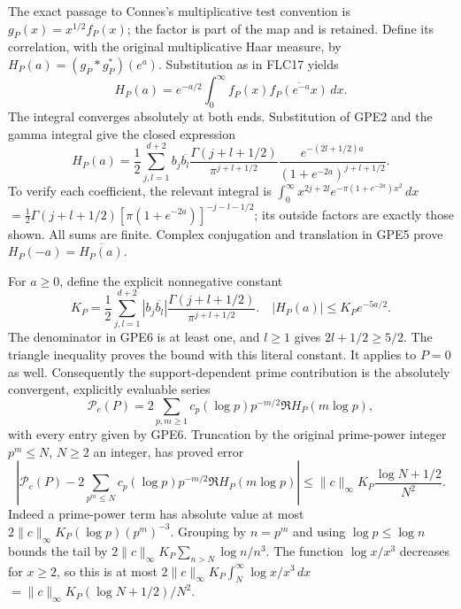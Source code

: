 \documentclass[11pt]{article}
\begin{document}
The exact passage to Connes's multiplicative test convention is
$g_P(x)=x^{1/2}f_P(x)$; the factor is part of the map and is retained.
Define its correlation, with the original multiplicative Haar measure,
by $H_P(a)=(g_P*g_P^*)(e^a)$. Substitution as in FLC17 yields
\[
H_P(a)=e^{-a/2}\int_0^\infty
 f_P(x)\overline{f_P(e^{-a}x)}\,dx.
\tag{GPE5}
\]
The integral converges absolutely at both ends. Substitution of GPE2
and the gamma integral give the closed expression
\[
\boxed{
H_P(a)=\frac12\sum_{j,l=1}^{d+2}b_j\overline{b_l}
 \frac{\Gamma(j+l+1/2)}{\pi^{j+l+1/2}}
 \frac{e^{-(2l+1/2)a}}{(1+e^{-2a})^{j+l+1/2}}.}
\tag{GPE6}
\]
To verify each coefficient, the relevant integral is
$\int_0^\infty x^{2j+2l}e^{-\pi(1+e^{-2a})x^2}\,dx$
$=\tfrac12\Gamma(j+l+1/2)
[\pi(1+e^{-2a})]^{-j-l-1/2}$; its outside factors are exactly those
shown. All sums are finite. Complex conjugation and translation in
GPE5 prove $H_P(-a)=\overline{H_P(a)}$.

For $a\ge0$, define the explicit nonnegative constant
\[
K_P=\frac12\sum_{j,l=1}^{d+2}|b_j\overline{b_l}|
          \frac{\Gamma(j+l+1/2)}{\pi^{j+l+1/2}}.
\quad |H_P(a)|\le K_Pe^{-5a/2}.
\tag{GPE7}
\]
The denominator in GPE6 is at least one, and $l\ge1$ gives
$2l+1/2\ge5/2$. The triangle inequality proves the bound with this
literal constant. It applies to $P=0$ as well.
Consequently the support-dependent prime contribution is the
absolutely convergent, explicitly evaluable series
\[
\mathcal P_c(P)
=2\sum_{p,m\ge1}c_p(\log p)p^{-m/2}
                 \Re H_P(m\log p),
\tag{GPE8}
\]
with every entry given by GPE6. Truncation by the original prime-power
integer $p^m\le N$, $N\ge2$ an integer, has proved error
\[
\boxed{
\left|\mathcal P_c(P)-
 2\sum_{p^m\le N}c_p(\log p)p^{-m/2}\Re H_P(m\log p)\right|
 \le \|c\|_\infty K_P\frac{\log N+1/2}{N^2}.}
\tag{GPE9}
\]
Indeed a prime-power term has absolute value at most
$2\|c\|_\infty K_P(\log p)(p^m)^{-3}$. Grouping by $n=p^m$
and using $\log p\le\log n$ bounds the tail by
$2\|c\|_\infty K_P\sum_{n>N}\log n/n^3$.
The function $\log x/x^3$ decreases for $x\ge2$, so this is at most
$2\|c\|_\infty K_P\int_N^\infty\log x/x^3\,dx$
$=\|c\|_\infty K_P(\log N+1/2)/N^2$.
\end{document}
